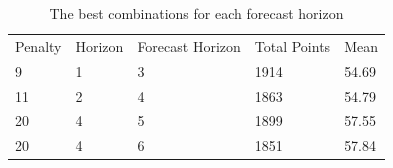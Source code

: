 \begin{table}[H]
\centering
\begin{tabular}{lllll}
Penalty & Horizon & Forecast Horizon & Total Points & Mean  \\
9       & 1       & 3                & 1914         & 54.69 \\
11      & 2       & 4                & 1863         & 54.79 \\
20      & 4       & 5                & 1899         & 57.55 \\
20      & 4       & 6                & 1851         & 57.84
\end{tabular}
\caption{The best combinations for each forecast horizon}
\label{tab:top_5}
\end{table}

